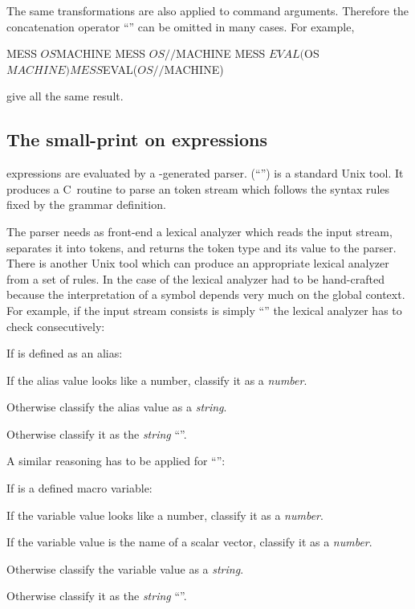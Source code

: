 The same transformations are also applied to command arguments.
Therefore the concatenation operator ``\Lit{//}'' can be omitted in
many cases.
For example,
\begin{XMP}
MESS $OS$MACHINE
MESS $OS//$MACHINE
MESS $EVAL($OS$MACHINE)
MESS $EVAL($OS//$MACHINE)
\end{XMP}
give all the same result.


\subsection{The small-print on \KUIP{} expressions}
\small

\KUIP{} expressions are evaluated by a -generated parser.
 (``'') is a standard
Unix tool.
It produces a C~routine to parse an token stream which follows the syntax rules
fixed by the grammar definition.

The parser needs as front-end a lexical analyzer which reads the input
stream, separates it into tokens, and returns the token type and its
value to the parser.
There is another Unix tool  which can produce an appropriate
lexical analyzer from a set of rules.
In the case of \KUIP{} the lexical analyzer had to be hand-crafted
because the interpretation of a symbol depends very much on the global
context.
For example,
if the input stream consists is simply ``'' the lexical
analyzer has to check consecutively:
\begin{UL}
\item
If  is defined as an alias:
\begin{ULc}
\item
If the alias value looks like a number, classify it as a
\textsl{number}.
\item
Otherwise classify the alias value as a \textsl{string}.
\end{ULc}
\item
Otherwise classify it as the \textsl{string} ``''.
\end{UL}

A similar reasoning has to be applied for ``\Lit{[foo]}'':
\begin{UL}
\item
If  is a defined macro variable:
\begin{ULc}
\item
If the variable value looks like a number, classify it as a
\textsl{number}.
\ifVECTOR
\item
If the variable value is the name of a scalar vector,
classify it as a \textsl{number}.
\fi
\item
Otherwise classify the variable value as a \textsl{string}.
\end{ULc}
\item
Otherwise classify it as the \textsl{string} ``''.
\end{UL}

